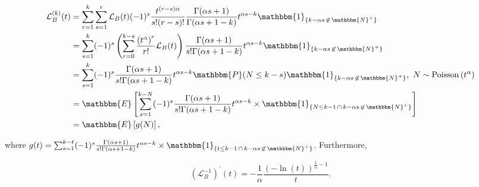 \documentclass[11pt, english]{article}\usepackage[]{graphicx}\usepackage[]{color}
\begin{document}
\begin{align*}
  \mathcal{L}^{(k)}_B(t) &= \sum_{r = 1}^k \sum_{s = 1}^r \mathcal{L}_B(t) (-1)^s \frac{t^{(r - s) \alpha}}{s! (r - s)!} \frac{\Gamma(\alpha s + 1)}{\Gamma(\alpha s + 1 - k)} t^{\alpha s - k} \mathbbm{1}_{\{k - \alpha s \, \not\in \, \mathbbm{N}^+\}} \\
  &= \sum_{s = 1}^k (-1)^s \left( \sum_{r = 0}^{k - s} \frac{\left(t^{\alpha}\right)^r}{r!} \mathcal{L}_B(t) \right) \frac{\Gamma(\alpha s + 1)}{s! \Gamma(\alpha s + 1 - k)} t^{\alpha s - k} \mathbbm{1}_{\{k - \alpha s \, \not\in \, \mathbbm{N}^+\}} \\
  &= \sum_{s = 1}^k (-1)^s \frac{\Gamma(\alpha s + 1)}{s! \Gamma(\alpha s + 1 - k)} t^{\alpha s - k} \mathbbm{P}(N \le k - s) \mathbbm{1}_{\{k - \alpha s \, \not\in \, \mathbbm{N}^+\}}, \, \, N \sim \mathrm{Poisson}\left(t^\alpha\right) \\
  &= \mathbbm{E} \left[ \sum_{s = 1}^{k - N}(-1)^s \frac{\Gamma(\alpha s + 1)}{s! \Gamma(\alpha s + 1 - k)} t^{\alpha s - k} \times \mathbbm{1}_{\{N \le k - 1 \, \cap \, k - \alpha s \, \not\in \, \mathbbm{N}^+\}} \right] \\
  &= \mathbbm{E} \left[ g(N) \right],
\end{align*}

where $g(t) = \sum_{s = 1}^{k - t}(-1)^s \frac{\Gamma(\alpha s + 1)}{s! \Gamma(\alpha s + 1 - k)} t^{\alpha s - k} \times \mathbbm{1}_{\{t \le k - 1 \, \cap \, k - \alpha s \, \not\in \, \mathbbm{N}^+\}}$. Furthermore,

$$ \left(\mathcal{L}_B^{-1}\right)^{\prime}(t) = -\frac{1}{\alpha} \frac{(-\ln(t))^{\frac{1}{\alpha} - 1}}{t}. $$

\newpage



\end{document}
